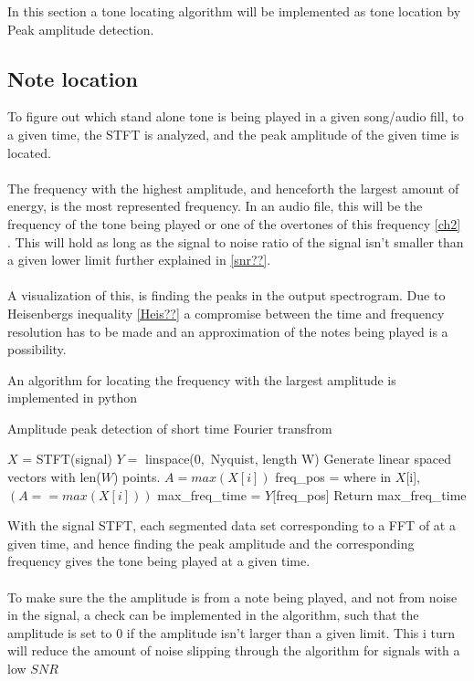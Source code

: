 In this section a tone locating algorithm will be implemented as tone location by Peak amplitude detection.
\subsection{Note location}
To figure out which stand alone tone is being played in a given song/audio fill, to a given time, the STFT is analyzed, and the peak amplitude of the given time is located.\\
\\
The frequency with the highest amplitude, and henceforth the largest amount of energy, is the most represented frequency. 
In an audio file, this will be the frequency of the tone being played or one of the overtones of this frequency \ref{ch2} .
This will hold as long as the signal to noise ratio of the signal isn't smaller than a given lower limit further explained in \ref{snr??}. 
\\
\\
A visualization of this, is finding the peaks in the output spectrogram.
Due to Heisenbergs inequality \ref{Heis??}  a compromise between the time and frequency resolution has to be made and an approximation of the notes being played is a possibility.

An algorithm for locating the frequency with the largest amplitude  is implemented in python 
\begin{algorithm}[H]
\caption{Amplitude peak detection of short time Fourier transfrom}
\label{alg:FIR}
\begin{algorithmic}[1] 
\State  $X$ = STFT(signal) 
\State $Y =$ linspace($0,$ Nyquist, length W) \Comment Generate linear spaced vectors with len($W$) points.
		\State $A = max(X[i])$ 
		\State freq\_pos = where in $X$[i], $(A == max(X[i]))$ 
		\State max\_freq\_time = $Y$[freq\_pos]
	\EndFor
	\State Return max\_freq\_time
\EndProcedure
\end{algorithmic}
\end{algorithm}




With the signal STFT, each segmented data set corresponding to a FFT of at a given time, and hence finding the peak amplitude and the corresponding frequency gives the tone being played at a given time.
\\\\
To make sure the the amplitude is from a note being played, and not from noise in the signal, a check can be implemented in the algorithm, such that the amplitude is set to $0$ if the amplitude isn't larger than a given limit.
This i turn will reduce the amount of noise slipping through the algorithm for signals with a low $SNR$
\\

